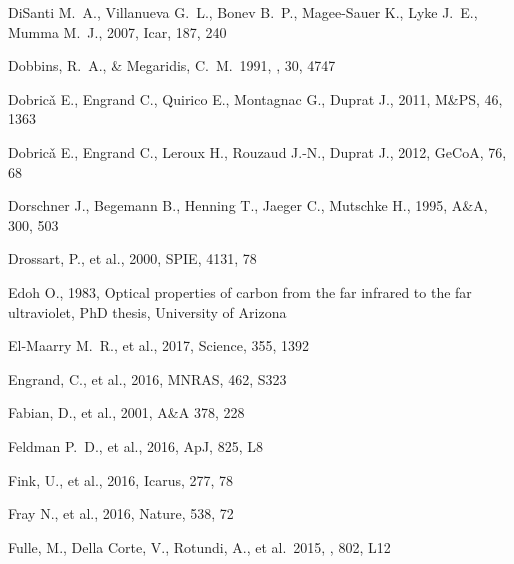 \documentclass[a4paper,fleqn,usenatbib]{mnras}
\begin{document}
\begin{thebibliography}{99}
 DiSanti M.~A., Villanueva G.~L., Bonev B.~P., Magee-Sauer K., Lyke J.~E., Mumma M.~J., 2007, Icar, 187, 240

 Dobbins, R.~A., \& Megaridis, C.~M.\ 1991, \ao, 30, 4747

 Dobric{\v a} E., Engrand C., Quirico E., Montagnac G., Duprat J., 2011, M\&PS, 46, 1363

 Dobric{\v a} E., Engrand C., Leroux H., Rouzaud J.-N., Duprat J., 2012, GeCoA, 76, 68

 Dorschner J., Begemann B., Henning T., Jaeger C., Mutschke H., 1995, A\&A, 300, 503

 Drossart, P., et al., 2000, SPIE, 4131, 78

 Edoh O., 1983, Optical properties of carbon from the far infrared to the far ultraviolet, PhD thesis, University of Arizona

 El-Maarry M.~R., et al., 2017, Science, 355, 1392

 Engrand, C., et al., 2016, MNRAS, 462, S323


 Fabian, D., et al., 2001, A\&A 378, 228

 Feldman P.~D., et al., 2016, ApJ, 825, L8

 Fink, U., et al., 2016, Icarus, 277, 78

 Fray N., et al., 2016, Nature, 538, 72


 Fulle, M., Della Corte, V., Rotundi, A., et al.\ 2015, \apjl, 802, L12


\end{thebibliography}
\end{document}

